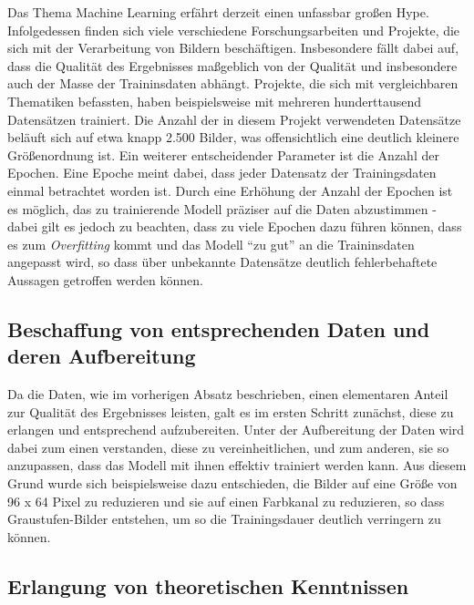 Das Thema Machine Learning erfährt derzeit einen unfassbar großen Hype. Infolgedessen finden sich viele verschiedene
Forschungsarbeiten und Projekte, die sich mit der Verarbeitung von Bildern beschäftigen. Insbesondere fällt dabei auf,
dass die Qualität des Ergebnisses maßgeblich von der Qualität und insbesondere auch der Masse der Traininsdaten abhängt.
Projekte, die sich mit vergleichbaren Thematiken befassten, haben beispielsweise mit mehreren hunderttausend Datensätzen
trainiert. Die Anzahl der in diesem Projekt verwendeten Datensätze beläuft sich auf etwa knapp 2.500 Bilder, was
offensichtlich eine deutlich kleinere Größenordnung ist.
Ein weiterer entscheidender Parameter ist die Anzahl der Epochen. Eine Epoche meint dabei, dass jeder Datensatz der
Trainingsdaten einmal betrachtet worden ist. Durch eine Erhöhung der Anzahl der Epochen ist es möglich, das zu trainierende
Modell präziser auf die Daten abzustimmen - dabei gilt es jedoch zu beachten, dass zu viele Epochen dazu führen können,
dass es zum \textit{Overfitting} kommt und das Modell ``zu gut'' an die Traininsdaten angepasst wird, so dass
über unbekannte Datensätze deutlich fehlerbehaftete Aussagen getroffen werden können.

\subsection{Beschaffung von entsprechenden Daten und deren Aufbereitung}

Da die Daten, wie im vorherigen Absatz beschrieben, einen elementaren Anteil zur Qualität des Ergebnisses leisten, galt
es im ersten Schritt zunächst, diese zu erlangen und entsprechend aufzubereiten. Unter der Aufbereitung der Daten wird
dabei zum einen verstanden, diese zu vereinheitlichen, und zum anderen, sie so anzupassen, dass das Modell mit ihnen
effektiv trainiert werden kann. Aus diesem Grund wurde sich beispielsweise dazu entschieden, die Bilder auf eine Größe
von 96 x 64 Pixel zu reduzieren und sie auf einen Farbkanal zu reduzieren, so dass Graustufen-Bilder entstehen, um so
die Trainingsdauer deutlich verringern zu können.

\subsection{Erlangung von theoretischen Kenntnissen}

